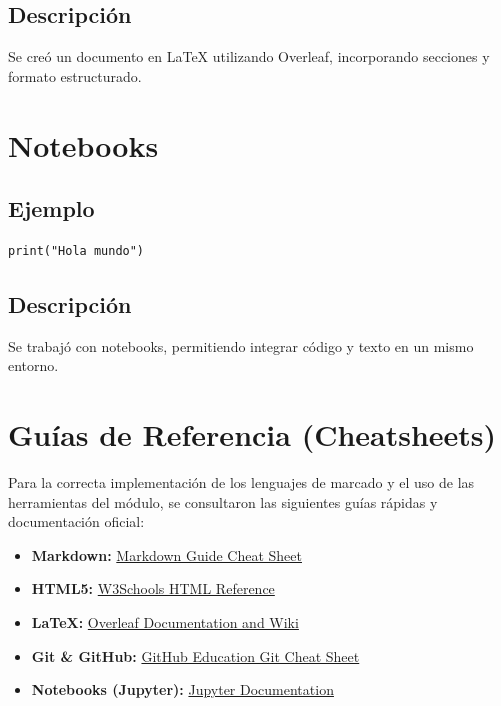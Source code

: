 \documentclass[runningheads]{llncs}
\begin{document}
\subsection{Descripción}

Se creó un documento en LaTeX utilizando Overleaf, incorporando secciones y formato estructurado.

\section{Notebooks}

\subsection{Ejemplo}
\begin{lstlisting}[caption=Ejemplo Notebook]
print("Hola mundo")
\end{lstlisting}

\subsection{Descripción}

Se trabajó con notebooks, permitiendo integrar código y texto en un mismo entorno.

\section{Guías de Referencia (Cheatsheets)}

Para la correcta implementación de los lenguajes de marcado y el uso de las herramientas del módulo, se consultaron las siguientes guías rápidas y documentación oficial:

\begin{itemize}
    \item \textbf{Markdown:} \href{https://www.markdownguide.org/cheat-sheet/}{Markdown Guide Cheat Sheet} \cite{markdown}
    \item \textbf{HTML5:} \href{https://www.w3schools.com/tags/default.asp}{W3Schools HTML Reference} \cite{html}
    \item \textbf{LaTeX:} \href{https://www.overleaf.com/learn}{Overleaf Documentation and Wiki} \cite{latex}
    \item \textbf{Git \& GitHub:} \href{https://education.github.com/git-cheat-sheet-education.pdf}{GitHub Education Git Cheat Sheet} \cite{git}
    \item \textbf{Notebooks (Jupyter):} \href{https://jupyter.org/documentation}{Jupyter Documentation} \cite{notebooks}
\end{itemize}
\end{document}
